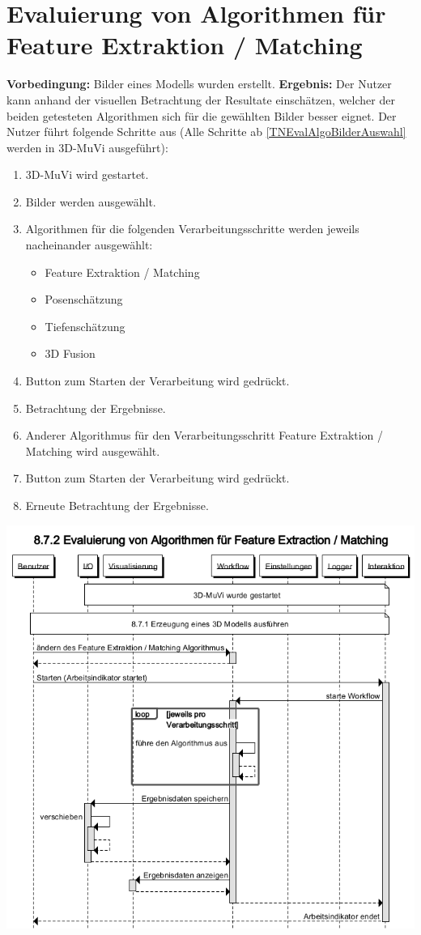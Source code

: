 \section{Evaluierung von Algorithmen für Feature Extraktion / Matching}
\label{TNEvalAlgo}
\textbf{Vorbedingung:} Bilder eines Modells wurden erstellt. \newline
\textbf{Ergebnis:} Der Nutzer kann anhand der visuellen Betrachtung der Resultate einschätzen, welcher der beiden getesteten Algorithmen sich für die gewählten Bilder besser eignet. \newline
Der Nutzer führt folgende Schritte aus (Alle Schritte ab \ref{TNEvalAlgoBilderAuswahl} werden in 3D-MuVi ausgeführt):
\begin{enumerate}
	\item 3D-MuVi wird gestartet.
	\item \label{TNEvalAlgoBilderAuswahl} Bilder werden ausgewählt.
	\item Algorithmen für die folgenden Verarbeitungsschritte werden jeweils nacheinander ausgewählt:
	\begin{itemize}
		\item Feature Extraktion / Matching
		\item Posenschätzung
		\item Tiefenschätzung
		\item 3D Fusion
	\end{itemize}
	\item Button zum Starten der Verarbeitung wird gedrückt.
	\item Betrachtung der Ergebnisse.
	\item Anderer Algorithmus für den Verarbeitungsschritt Feature Extraktion / Matching wird ausgewählt.
	\item Button zum Starten der Verarbeitung wird gedrückt.
	\item Erneute Betrachtung der Ergebnisse.
\end{enumerate}
\includegraphics[width=1.05\textwidth]{img/872_Seqz.png}

